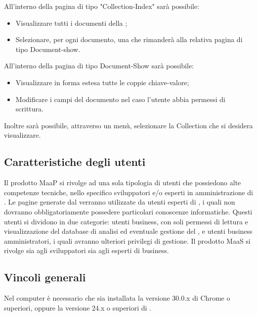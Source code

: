All'interno della pagina di tipo "Collection-Index" sarà possibile:
\begin{itemize}
\item Visualizzare tutti i documenti della ;
\item Selezionare, per ogni documento, una  che rimanderà alla relativa pagina di tipo Document-show.
\end{itemize}

All'interno della pagina di tipo Document-Show sarà possibile:
\begin{itemize}
\item Visualizzare in forma estesa tutte le coppie chiave-valore;
\item Modificare i campi del documento nel caso l'utente abbia permessi di scrittura.
\end{itemize}

Inoltre sarà possibile, attraverso un menù, selezionare la Collection che si desidera visualizzare.

\subsection{Caratteristiche degli utenti}
Il prodotto MaaP si rivolge ad una sola tipologia di utenti che possiedono alte competenze tecniche, nello specifico sviluppatori e/o esperti in amministrazione di . Le pagine generate dal  verranno utilizzate da utenti esperti di , i quali non dovranno obbligatoriamente possedere particolari conoscenze informatiche. Questi utenti si dividono in due categorie: utenti business, con soli permessi di lettura e visualizzazione del database di analisi ed eventuale gestione del , e utenti business amministratori, i quali avranno ulteriori privilegi di gestione.
Il prodotto MaaS si rivolge sia agli sviluppatori sia agli esperti di business.

\subsection{Vincoli generali}
Nel computer è necessario che sia installata la versione 30.0.x di  Chrome o superiori, oppure la versione 24.x o superiori di .

\newpage
